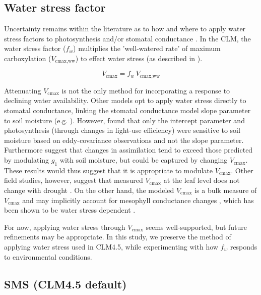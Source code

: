 \documentclass[draft,linenumbers]{agujournal}
\begin{document}
\subsection{Water stress factor}
\label{sect:wsf}
     Uncertainty remains within the literature as to how and where to apply water stress factors to photosynthesis and/or stomatal conductance 
    \citep{zhou2013,novick2016a,sperry2015}.
    In the CLM, the water stress factor ($f_w$) multiplies the 'well-watered rate' of maximum carboxylation ($V_{\text{cmax,ww}}$) to effect water stress (as described in \citet{oleson2013}). 
    
    \begin{equation}
    V_{\text{cmax}} = f_w\, V_{\text{cmax,ww}} 
    \end{equation}

    Attenuating $V_{\text{cmax}}$ is not the only method for incorporating a response to declining water availability. 
    Other models opt to apply water stress directly to stomatal conductance, linking the stomatal conductance model slope parameter to soil moisture 
    (e.g. \cite{dekauwe2015}).
     However, \cite{lin2018} found that only the intercept parameter and photosynthesis (through changes in light-use efficiency) were sensitive to soil moisture based on eddy-covariance observations and not the slope parameter.
    Furthermore \cite{zhou2013} suggest that changes in assimilation tend to exceed those predicted by modulating $g_1$ with soil moisture, but could be captured by changing $V_{\text{cmax}}$. These results would thus suggest that it is appropriate to modulate $V_{\text{cmax}}$.
    Other field studies, however, suggest that measured $V_{\text{cmax}}$ at the leaf level does not change with drought \citep{flexas2004}. 
    On the other hand, the modeled $V_{\text{cmax}}$ is a bulk measure of $V_{\text{cmax}}$ and may implicitly account for mesophyll conductance changes \citep{rogers2017}, which has been shown to be water stress dependent \citep{flexas2012}.

    For now, applying water stress through $V_{\text{cmax}}$ seems well-supported, but future refinements may be appropriate.
    In this study, we preserve the method of applying water stress used in CLM4.5, while experimenting with how $f_w$ responds to environmental conditions.
    
    \subsection{SMS (CLM4.5 default)}
    \label{sect:sms}
\end{document}
